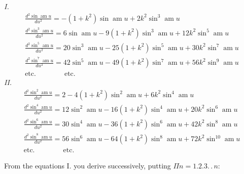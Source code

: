 \documentclass{article}
\begin{document}
\emph{I.}
\[
\begin{gathered}
\frac{d^{2}\sin\operatorname{am}u}{du^{2}}=-(1+k^{2})\sin\operatorname{am}u+2k^{2}\sin^{3}\operatorname{am}u\\[1.5ex]
\frac{d^{2}\sin^{3}\operatorname{am}u}{du^{2}}=6\sin\operatorname{am}u-9(1+k^{2})\sin^{3}\operatorname{am}u+12k^{2}\sin^{5}\operatorname{am}u\\[1.5ex]
\frac{d^{2}\sin^{5}\operatorname{am}u}{du^{2}}=20\sin^{3}\operatorname{am}u-25(1+k^{2})\sin^{5}\operatorname{am}u+30k^{2}\sin^{7}\operatorname{am}u\\[1.5ex]
\frac{d^{2}\sin^{7}\operatorname{am}u}{du^{2}}=42\sin^{5}\operatorname{am}u-49(1+k^{2})\sin^{7}\operatorname{am}u+56k^{2}\sin^{9}\operatorname{am}u\\[1.5ex]
\text{etc.}\qquad\qquad\text{etc.}
\end{gathered}
\]
\emph{II.}
\[
\begin{gathered}
\frac{d^{2}\sin^{2}\operatorname{am}u}{du^{2}}=2-4(1+k^{2})\sin^{2}\operatorname{am}u+6k^{2}\sin^{4}\operatorname{am}u\\[1.5ex]
\frac{d^{2}\sin^{4}\operatorname{am}u}{du^{2}}=12\sin^{2}\operatorname{am}u-16(1+k^{2})\sin^{4}\operatorname{am}u+20k^{2}\sin^{6}\operatorname{am}u\\[1.5ex]
\frac{d^{2}\sin^{6}\operatorname{am}u}{du^{2}}=30\sin^{4}\operatorname{am}u-36(1+k^{2})\sin^{6}\operatorname{am}u+42k^{2}\sin^{8}\operatorname{am}u\\[1.5ex]
\frac{d^{2}\sin^{8}\operatorname{am}u}{du^{2}}=56\sin^{6}\operatorname{am}u-64(1+k^{2})\sin^{8}\operatorname{am}u+72k^{2}\sin^{10}\operatorname{am}u\\[1.5ex]
\text{etc.}\qquad\qquad\text{etc.}
\end{gathered}
\]


From the equations I. you derive successively, putting $\Pi n=1.2.3.\,.\,n$:
\end{document}
